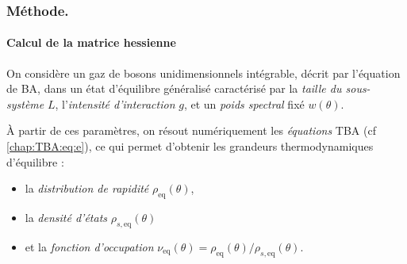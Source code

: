 
\subsubsection{Méthode.}

\paragraph{Calcul de la matrice hessienne}


On considère un gaz de bosons unidimensionnels intégrable, décrit par l'équation de \gls{BA}, dans un état d'équilibre généralisé caractérisé par la {\em taille du sous-système} \(L\), l'{\em intensité d'interaction} \(g\), et un {\em poids spectral} fixé \(w(\theta)\).

À partir de ces paramètres, on résout numériquement les {\em équations} \gls{TBA} (cf \eqref{chap:TBA:eq:e}), ce qui permet d'obtenir les grandeurs thermodynamiques d'équilibre :
\begin{itemize}[label = $\bullet$]
	\item la {\em distribution de rapidité} \( \rho_{\mathrm{eq}}(\theta) \),
	\item la {\em densité d'états} \( \rho_{s,\mathrm{eq}}(\theta) \)
	\item et la {\em fonction d'occupation} \( \nu_{\! \mathrm{eq}}(\theta) = \rho_{\! \mathrm{eq}}(\theta) / \rho_{\! s,\mathrm{eq}}(\theta) \).
\end{itemize}


